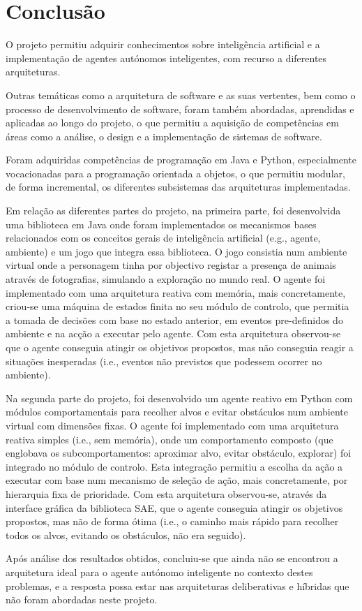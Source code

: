 \chapter{Conclusão}\label{ch:conclusao}

O projeto permitiu adquirir conhecimentos sobre inteligência artificial e a implementação de agentes autónomos inteligentes, com recurso a diferentes arquiteturas.

Outras temáticas como a arquitetura de software e as suas vertentes, bem como o processo de desenvolvimento de software, foram também abordadas, aprendidas e aplicadas ao longo do projeto, o que permitiu a aquisição de competências em áreas como a análise, o design e a implementação de sistemas de software.

Foram adquiridas competências de programação em Java e Python, especialmente vocacionadas para a programação orientada a objetos, o que permitiu modular, de forma incremental, os diferentes subsistemas das arquiteturas implementadas.

Em relação as diferentes partes do projeto, na primeira parte, foi desenvolvida uma biblioteca em Java onde foram implementados os mecanismos bases relacionados com os conceitos gerais de inteligência artificial (e.g., agente, ambiente) e um jogo que integra essa biblioteca.
O jogo consistia num ambiente virtual onde a personagem tinha por objectivo registar a presença de animais através de fotografias, simulando a exploração no mundo real.
O agente foi implementado com uma arquitetura reativa com memória, mais concretamente, criou-se uma máquina de estados finita no seu módulo de controlo, que permitia a tomada de decisões com base no estado anterior, em eventos pre-definidos do ambiente e na acção a executar pelo agente.
Com esta arquitetura observou-se que o agente conseguia atingir os objetivos propostos, mas não conseguia reagir a situações inesperadas (i.e., eventos não previstos que podessem ocorrer no ambiente).

Na segunda parte do projeto, foi desenvolvido um agente reativo em Python com módulos comportamentais para recolher alvos e evitar obstáculos num ambiente virtual com dimensões fixas.
O agente foi implementado com uma arquitetura reativa simples (i.e., sem memória), onde um comportamento composto (que englobava os subcomportamentos: aproximar alvo, evitar obstáculo, explorar) foi integrado no módulo de controlo. Esta integração permitiu a escolha da ação a executar com base num mecanismo de seleção de ação, mais concretamente, por hierarquia fixa de prioridade. Com esta arquitetura observou-se, através da interface gráfica da biblioteca SAE, que o agente conseguia atingir os objetivos propostos, mas não de forma ótima (i.e., o caminho mais rápido para recolher todos os alvos, evitando os obstáculos, não era seguido).

Após análise dos resultados obtidos, concluiu-se que ainda não se encontrou a arquitetura ideal para o agente autónomo inteligente no contexto destes problemas, e a resposta possa estar nas arquiteturas deliberativas e híbridas que não foram abordadas neste projeto.
